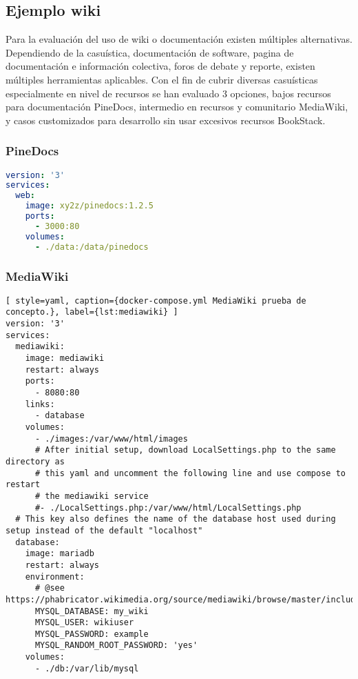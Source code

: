 \subsection{Ejemplo wiki}
Para la evaluación del uso de wiki o documentación existen múltiples alternativas. Dependiendo de la casuística, documentación de software, pagina de documentación e información colectiva, foros de debate y reporte, existen múltiples herramientas aplicables. Con el fin de cubrir diversas casuísticas especialmente en nivel de recursos se han evaluado 3 opciones, bajos recursos para documentación PineDocs\cite{c_pinedocs}, intermedio en recursos y comunitario MediaWiki\cite{c_media_wiki}, y casos customizados para desarrollo sin usar excesivos recursos BookStack\cite{c_bookstack}.

\subsubsection{PineDocs}
\begin{lstlisting}[language=yml, style=yaml, caption={docker-compose.yml PineDocs prueba de concepto.}, label={lst:pinedocs} ]
version: '3'
services:
  web:
    image: xy2z/pinedocs:1.2.5
    ports:
      - 3000:80
    volumes:
      - ./data:/data/pinedocs
\end{lstlisting}

\subsubsection{MediaWiki}
\begin{lstlisting}[ style=yaml, caption={docker-compose.yml MediaWiki prueba de concepto.}, label={lst:mediawiki} ]
version: '3'
services:
  mediawiki:
    image: mediawiki
    restart: always
    ports:
      - 8080:80
    links:
      - database
    volumes:
      - ./images:/var/www/html/images
      # After initial setup, download LocalSettings.php to the same directory as
      # this yaml and uncomment the following line and use compose to restart
      # the mediawiki service
      #- ./LocalSettings.php:/var/www/html/LocalSettings.php
  # This key also defines the name of the database host used during setup instead of the default "localhost"
  database:
    image: mariadb
    restart: always
    environment:
      # @see https://phabricator.wikimedia.org/source/mediawiki/browse/master/includes/DefaultSettings.php
      MYSQL_DATABASE: my_wiki
      MYSQL_USER: wikiuser
      MYSQL_PASSWORD: example
      MYSQL_RANDOM_ROOT_PASSWORD: 'yes'
    volumes:
      - ./db:/var/lib/mysql
\end{lstlisting}

